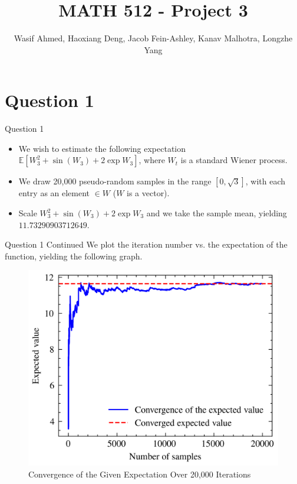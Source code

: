 \documentclass[compress,12pt]{beamer}
\title{MATH 512 - Project 3}
\subtitle{}
\date{}
\author{Wasif Ahmed, Haoxiang Deng, Jacob Fein-Ashley, Kanav Malhotra, Longzhe Yang}
\begin{document}
\frame[plain]{\titlepage}

\section{Question 1}


\begin{frame}{Question 1}

    \begin{itemize}
        \item We wish to estimate the following expectation $\mathbb{E}[W_3^2 + \sin(W_3) + 2\exp{W_3}]$, where $W_t$ is a standard Wiener process.

        \item We draw 20,000 pseudo-random samples in the range $[0, \sqrt{3}]$, with each entry as an element $\in W$ ($W$ is a vector).

        \item Scale $W_3^2 + \sin(W_3) + 2\exp{W_3}$ and we take the sample mean, yielding $\boxed{11.73290903712649}$.

    \end{itemize}
    
\end{frame}

\begin{frame}{Question 1 Continued}
    We plot the iteration number vs. the expectation of the function, yielding the following graph.

    \begin{figure}
        \centering
        \includegraphics{imgs/convergence.png}
        \caption{Convergence of the Given Expectation Over 20,000 Iterations}
        \label{fig:convergence}
    \end{figure}
\end{frame}
\end{document}
